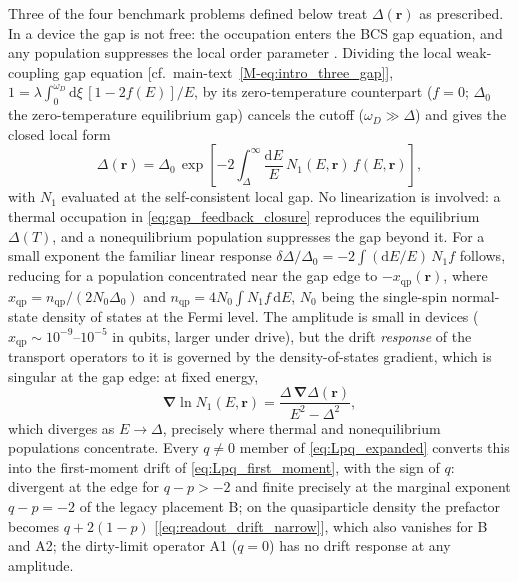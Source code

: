 \documentclass[
  aps,
  prb,
  preprint,
  superscriptaddress,
  longbibliography,
  nofootinbib
]{revtex4-2}
\newcommand{\dd}{\mathrm{d}}
\newcommand{\br}{\mathbf{r}}
\newcommand{\bnabla}{\boldsymbol{\nabla}}
\newcommand{\DOS}{N_1}
\newcommand{\qp}{\mathrm{qp}}
\begin{document}
Three of the four benchmark problems defined below treat \(\Delta(\br)\) as prescribed. In a device the
gap is not free: the occupation enters the BCS gap equation, and any
population suppresses the local order parameter
\cite{owen1972,parker1975}. Dividing the local weak-coupling gap
equation [cf.~main-text~\cref{M-eq:intro_three_gap}],
\(1=\lambda\int_0^{\omega_D}\dd\xi\,[1-2f(E)]/E\), by its
zero-temperature counterpart (\(f=0\); \(\Delta_0\) the zero-temperature
equilibrium gap) cancels the cutoff (\(\omega_D\gg\Delta\)) and
gives the closed local form
\begin{equation}
  \Delta(\br)
  =
  \Delta_0\,
  \exp\!\left[
    -2\int_{\Delta}^{\infty}\frac{\dd E}{E}\,\DOS(E,\br)\,f(E,\br)
  \right],
  \label{eq:gap_feedback_closure}
\end{equation}
with \(\DOS\) evaluated at the self-consistent local gap. No
linearization is involved: a thermal occupation in
\cref{eq:gap_feedback_closure} reproduces the equilibrium \(\Delta(T)\),
and a nonequilibrium population suppresses the gap beyond it. For a
small exponent the familiar linear response
\(\delta\Delta/\Delta_0=-2\int(\dd E/E)\,\DOS f\) follows, reducing for
a population concentrated near the gap edge to \(-x_{\qp}(\br)\), where
\(x_{\qp}=n_{\qp}/(2N_0\Delta_0)\) and
\(n_{\qp}=4N_0\int\DOS f\,\dd E\), \(N_0\) being the single-spin
normal-state density of states at the Fermi level. The amplitude is small in devices
(\(x_{\qp}\sim10^{-9}\)--\(10^{-5}\) in qubits, larger under drive), but
the drift \emph{response} of the transport operators to it is governed
by the density-of-states gradient, which is singular at the gap
edge: at fixed energy,
\begin{equation}
  \bnabla\ln\DOS(E,\br)
  =
  \frac{\Delta\,\bnabla\Delta(\br)}{E^2-\Delta^2},
  \label{eq:dos_gradient_response}
\end{equation}
which diverges as \(E\to\Delta\), precisely where thermal and
nonequilibrium populations concentrate. Every \(q\neq0\) member of
\cref{eq:Lpq_expanded} converts this into the first-moment drift of
\cref{eq:Lpq_first_moment}, with the sign of \(q\): divergent
at the edge for \(q-p>-2\) and finite precisely at the marginal exponent
\(q-p=-2\) of the legacy placement B; on the quasiparticle density the
prefactor becomes \(q+2(1-p)\) [\cref{eq:readout_drift_narrow}], which
also vanishes for B and A2; the
dirty-limit operator A1 (\(q=0\)) has no drift response at any amplitude.
\end{document}
